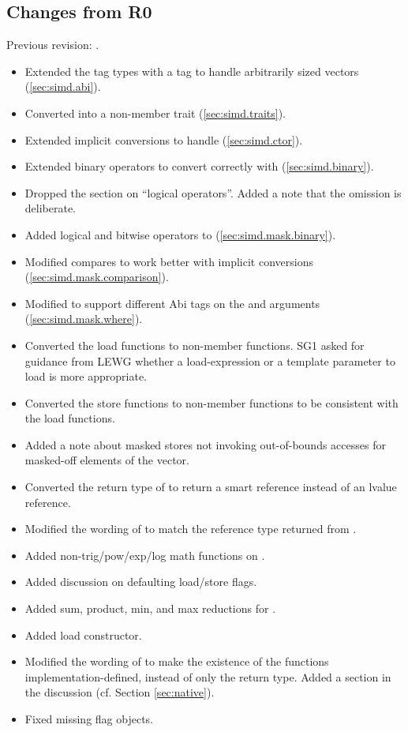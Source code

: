 \subsection{Changes from R0}
Previous revision: \parencite{P0214R0}.
\begin{itemize}
  \item Extended the  tag types with a  tag to handle arbitrarily sized vectors (\ref{sec:simd.abi}).
  \item Converted  into a non-member trait (\ref{sec:simd.traits}).
  \item Extended implicit conversions to handle \fixedsizeN (\ref{sec:simd.ctor}).
  \item Extended binary operators to convert correctly with \fixedsizeN (\ref{sec:simd.binary}).
  \item Dropped the section on “\simd logical operators”. Added a note that the omission is deliberate.
  \item Added logical and bitwise operators to \mask (\ref{sec:simd.mask.binary}).
  \item Modified \mask compares to work better with implicit conversions (\ref{sec:simd.mask.comparison}).
  \item Modified  to support different Abi tags on the \mask and \simd arguments (\ref{sec:simd.mask.where}).
  \item Converted the load functions to non-member functions.
    SG1 asked for guidance from LEWG whether a load-expression or a template parameter to load is more appropriate.
  \item Converted the store functions to non-member functions to be consistent with the load functions.
  \item Added a note about masked stores not invoking out-of-bounds accesses for masked-off elements of the vector.
  \item Converted the return type of \simd{} to return a smart reference instead of an lvalue reference.
  \item Modified the wording of \mask{} to match the reference type returned from \simd{}.
  \item Added non-trig/pow/exp/log math functions on \simd.
  \item Added discussion on defaulting load/store flags.
  \item Added sum, product, min, and max reductions for \simd.
  \item Added load constructor.
  \item Modified the wording of  to make the existence of the functions implementation-defined, instead of only the return type.
    Added a section in the discussion (cf. Section \ref{sec:native}).
  \item Fixed missing flag objects.
\end{itemize}








